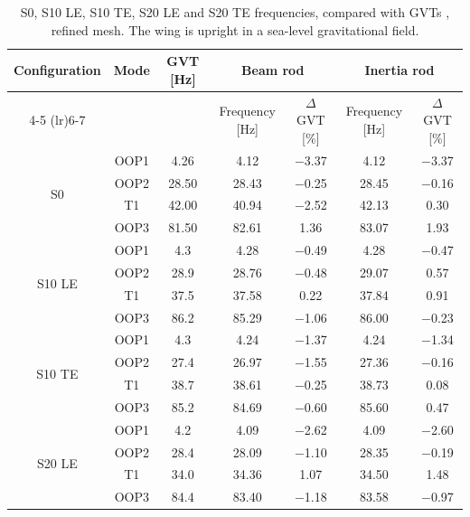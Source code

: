 \documentclass[journal]{new-aiaa}
\begin{document}
\begin{table}[ht!]
    \centering
    \caption{S0, S10 LE, S10 TE, S20 LE and S20 TE frequencies, compared with GVTs \cite{avin2022experimental,revivo2026flutterpost,revivoS10data,revivoS20data}, refined mesh. The wing is upright in a sea-level gravitational field.}
    \label{tab:S0_gvt_comparison}
    \setlength{\tabcolsep}{4pt}
    \begin{threeparttable}
    \begin{tabular}{c c c cc cc}
        \toprule
        \multirow{2}{*}{Configuration} & \multirow{2}{*}{Mode} & \multirow{2}{*}{GVT [Hz]} & \multicolumn{2}{c}{Beam rod} & \multicolumn{2}{c}{Inertia rod\tnote{a}} \\
        \cmidrule(lr){4-5} \cmidrule(lr){6-7}
        & & & Frequency [Hz] & $\Delta$ GVT [\%] & Frequency [Hz] & $\Delta$ GVT [\%] \\
        \midrule
        \multirow{4}{*}{S0} & OOP1 & 4.26 & 4.12 & $-$3.37 & 4.12 & $-$3.37 \\
        & OOP2 & 28.50 & 28.43 & $-$0.25 & 28.45 & $-$0.16 \\
        & T1 & 42.00 & 40.94 & $-$2.52 & 42.13 & 0.30 \\
        & OOP3 & 81.50 & 82.61 & 1.36 & 83.07 & 1.93 \\
        \midrule
        \multirow{4}{*}{S10 LE} & OOP1 & 4.3 & 4.28 & $-$0.49 & 4.28 & $-$0.47 \\
        & OOP2 & 28.9 & 28.76 & $-$0.48 & 29.07 & 0.57 \\
        & T1 & 37.5 & 37.58 & 0.22 & 37.84 & 0.91 \\
        & OOP3 & 86.2 & 85.29 & $-$1.06 & 86.00 & $-$0.23 \\
        \midrule
        \multirow{4}{*}{S10 TE} & OOP1 & 4.3 & 4.24 & $-$1.37 & 4.24 & $-$1.34 \\
        & OOP2 & 27.4 & 26.97 & $-$1.55 & 27.36 & $-$0.16 \\
        & T1 & 38.7 & 38.61 & $-$0.25 & 38.73 & 0.08 \\
        & OOP3 & 85.2 & 84.69 & $-$0.60 & 85.60 & 0.47 \\
        \midrule
        \multirow{4}{*}{S20 LE} & OOP1 & 4.2 & 4.09 & $-$2.62 & 4.09 & $-$2.60 \\
        & OOP2 & 28.4 & 28.09 & $-$1.10 & 28.35 & $-$0.19 \\
        & T1 & 34.0 & 34.36 & 1.07 & 34.50 & 1.48 \\
        & OOP3 & 84.4 & 83.40 & $-$1.18 & 83.58 & $-$0.97 \\

\end{tabular}
\end{threeparttable}
\end{table}
\end{document}
